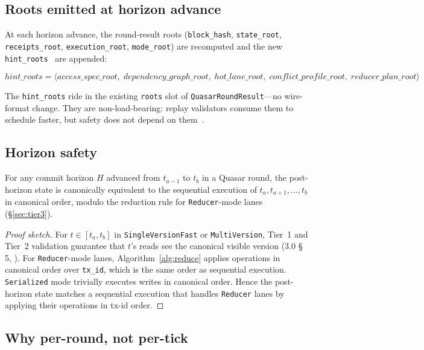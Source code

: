 \subsection{Roots emitted at horizon advance}

At each horizon advance, the round-result roots
(\texttt{block\_hash}, \texttt{state\_root}, \texttt{receipts\_root},
\texttt{execution\_root}, \texttt{mode\_root}) are recomputed and the
new \texttt{hint\_roots}~\cite{chiron2025} are appended:

\[
\mathit{hint\_roots} = \langle
\mathit{access\_spec\_root},\;
\mathit{dependency\_graph\_root},\;
\mathit{hot\_lane\_root},\;
\mathit{conflict\_profile\_root},\;
\mathit{reducer\_plan\_root}
\rangle
\]

The \texttt{hint\_roots} ride in the existing \texttt{roots} slot of
\texttt{QuasarRoundResult}---no wire-format change. They are
non-load-bearing: replay validators consume them to schedule faster,
but safety does not depend on them~\cite{chiron2025}.

\subsection{Horizon safety}

\begin{theorem}
\label{thm:horizon-safety}
For any commit horizon $H$ advanced from $t_{a-1}$ to $t_b$ in a Quasar
round, the post-horizon state is canonically equivalent to the
sequential execution of $t_a, t_{a+1}, \ldots, t_b$ in canonical order,
modulo the reduction rule for \texttt{Reducer}-mode lanes
(\S\ref{sec:tier3}).
\end{theorem}
\begin{proof}[Proof sketch]
For $t \in [t_a, t_b]$ in \texttt{SingleVersionFast} or
\texttt{MultiVersion}, Tier~1 and Tier~2 validation guarantee that
$t$'s reads see the canonical visible version (3.0 \S\,5,
\cite{lp010-quasarstm-3,adya2000essn}). For \texttt{Reducer}-mode
lanes, Algorithm~\ref{alg:reduce} applies operations in canonical
order over \texttt{tx\_id}, which is the same order as sequential
execution. \texttt{Serialized} mode trivially executes writes in
canonical order. Hence the post-horizon state matches a sequential
execution that handles \texttt{Reducer} lanes by applying their
operations in tx-id order.
\end{proof}

\subsection{Why per-round, not per-tick}

